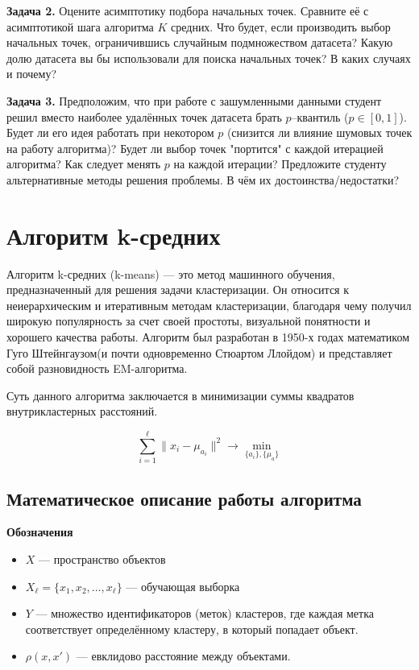 \textbf{Задача 2.} Оцените асимптотику подбора начальных точек. Сравните её с асимптотикой шага алгоритма $K$ средних.
Что будет, если производить выбор начальных точек, ограничившись случайным подмножеством датасета?
Какую долю датасета вы бы использовали для поиска начальных точек? В каких случаях и почему?

\textbf{Задача 3.} Предположим, что при работе с зашумленными данными студент
решил вместо наиболее удалённых точек датасета брать $p$--квантиль ($p\in [0, 1]$).
Будет ли его идея работать при некотором $p$ (снизится ли влияние шумовых точек на работу алгоритма)?
Будет ли выбор точек "портится" с каждой итерацией алгоритма? Как следует менять $p$ на каждой итерации?
Предложите студенту альтернативные методы решения проблемы. В чём их достоинства/недостатки?

\section{Алгоритм k-средних}

Алгоритм k-средних (k-means) — это метод машинного обучения, предназначенный для решения задачи кластеризации. Он относится к неиерархическим и итеративным методам кластеризации, благодаря чему получил широкую популярность за счет своей простоты, визуальной понятности и хорошего качества работы. Алгоритм был разработан в 1950-х годах математиком Гуго Штейнгаузом(и почти одновременно Стюартом Ллойдом) и представляет собой разновидность EM-алгоритма. 

Суть данного алгоритма заключается в минимизации суммы квадратов внутрикластерных расстояний. 

\[
    \sum_{i=1}^\ell \|x_i - \mu_{a_i}\|^2 \to \min_{\{a_i\}, \{\mu_a\}}
\]

\subsection{Математическое описание работы алгоритма}
\textbf{Обозначения}
\begin{itemize}
    \item \( X \) — пространство объектов
    \item \( X_\ell = \{ x_1, x_2, \ldots, x_\ell \} \) — обучающая выборка
    \item \( Y \) — множество идентификаторов (меток) кластеров, где каждая метка соответствует определённому кластеру, в который попадает объект.
    \item \( \rho(x, x') \) — евклидово расстояние между объектами.
\end{itemize}

